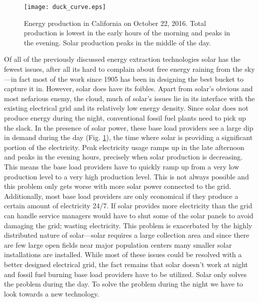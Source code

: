 \begin{figure}[ht]
    \centering
    \texttt{[image: duck\_curve.eps]}
    \caption{Energy production in California on October 22, 2016.\cite{caiso} Total production is lowest in the early hours of the morning and peaks in the evening. Solar production peaks in the middle of the day.}
    \label{fig:duck_curve}
\end{figure}
Of all of the previously discussed energy extraction technologies solar has the fewest issues, after all its hard to complain about free energy raining from the sky---in fact most of the work since 1905 has been in designing the best bucket to capture it in. However, solar does have its foibles. Apart from solar's obvious and most nefarious enemy, the cloud, much of solar's issues lie in its interface with the existing electrical grid and its relatively low energy density. Since solar does not produce energy during the night, conventional fossil fuel plants need to pick up the slack. In the presence of solar power, these base load providers see a large dip in demand during the day (Fig. \ref{fig:duck_curve}), the time where solar is providing a significant portion of the electricity. Peak electricity usage ramps up in the late afternoon and peaks in the evening hours, precisely when solar production is decreasing. This means the base load providers have to quickly ramp up from a very low production level to a very high production level. This is not always possible and this problem only gets worse with more solar power connected to the grid. Additionally, most base load providers are only economical if they produce a certain amount of electricity 24/7. If solar provides more electricity than the grid can handle service managers would have to shut some of the solar panels to avoid damaging the grid; wasting electricity. This problem is exacerbated by the highly distributed nature of solar---solar requires a large collection area and since there are few large open fields near major population centers many smaller solar installations are installed. While most of these issues could be resolved with a better designed electrical grid, the fact remains that solar doesn't work at night and fossil fuel burning base load providers have to be utilized. Solar only solves the problem during the day. To solve the problem during the night we have to look towards a new technology. 

